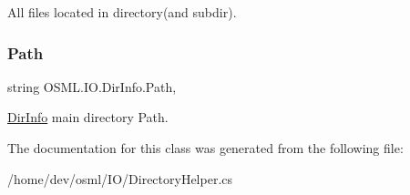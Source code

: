 All files located in directory(and subdir). 

\mbox{\label{classOSML_1_1IO_1_1DirInfo_a7b4f3e10256a610fb0d149c07f0ba1d1}} 
\subsubsection{\texorpdfstring{Path}{Path}}
{\footnotesize\ttfamily string O\+S\+M\+L.\+I\+O.\+Dir\+Info.\+Path\hspace{0.3cm}{\ttfamily [get]}, {\ttfamily [set]}}



\mbox{\hyperlink{classOSML_1_1IO_1_1DirInfo}{Dir\+Info}} main directory Path. 



The documentation for this class was generated from the following file\+:\begin{DoxyCompactItemize}
\item 
/home/dev/osml/\+I\+O/Directory\+Helper.\+cs\end{DoxyCompactItemize}
